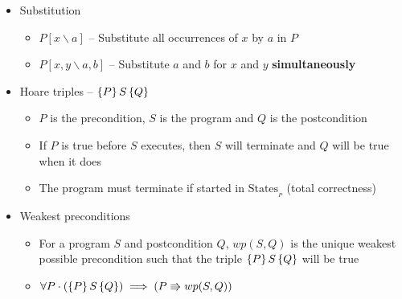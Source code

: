 \begin{itemize}
\begin{itemize}
	\end{itemize}

	\item Substitution
	
	\begin{itemize}
		
		\item $ P[x \backslash a] $ -- Substitute all occurrences of $ x $ by $ a $ in $ P $
		
		\item $ P[x, y \backslash a, b] $ -- Substitute $ a $ and $ b $ for $ x $ and $ y $ \textbf{simultaneously}
		
	\end{itemize}

	\item Hoare triples -- $ \left\lbrace P \right\rbrace S \left\lbrace Q \right\rbrace $
	
	\begin{itemize}
		
		\item $ P $ is the precondition, $ S $ is the program and $ Q $ is the postcondition
		
		\item If $ P $ is true before $ S $ executes, then $ S $ will terminate and $ Q $ will be true when it does
		
		\item The program must terminate if started in $ \text{States}_{_P} $ (total correctness)
		
	\end{itemize}
	
	\item Weakest preconditions
	
	\begin{itemize}
		
		\item For a program $ S $ and postcondition $ Q $, $ wp(S, Q) $ is the unique weakest possible precondition such that the triple $ \left\lbrace P \right\rbrace S \left\lbrace Q \right\rbrace $ will be true
		
		\item $ \forall P \cdot (\left\lbrace P \right\rbrace S \left\lbrace Q \right\rbrace) \implies (P \Rrightarrow wp(S, Q)) $
		
	\end{itemize}
		
\end{itemize}
